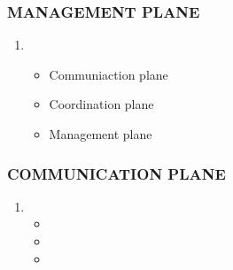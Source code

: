 \documentclass[11pt]{class}
\begin{document}
											\begin{frame}
												\frametitle{MANAGEMENT PLANE}
												\begin{enumerate}
													\item 
													\begin{itemize}
														\item Communiaction plane 
														\item Coordination plane
														\item Management plane
													\end{itemize}
													
												\end{enumerate}
											\end{frame}
												\begin{frame}
													\frametitle{COMMUNICATION PLANE}
													\begin{enumerate}
														\item 
														\begin{itemize}
															\item  
															\item 
															\item 
														\end{itemize}
														
													\end{enumerate}
												\end{frame}
\end{document}
